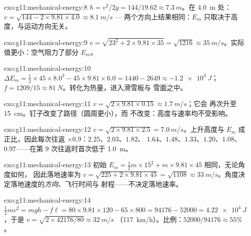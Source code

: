 \begin{solution}{exo:g11:mechanical-energy:8}
$h = v^2/2g = 144/19.62 \approx \qty{7.3}{m}$。在 \qty{4.0}{m} 处：
$v = \sqrt{144 - 2 \times 9.81 \times 4.0} \approx \qty{8.1}{m/s}$ ---
两个方向上结果相同：$E_m$ 只取决于高度，与运动方向无关。
\end{solution}

\begin{solution}{exo:g11:mechanical-energy:9}
$v = \sqrt{23^2 + 2 \times 9.81 \times 35} = \sqrt{1216} \approx
\qty{35}{m/s}$。实际值更小：空气阻力了部分
$E_m$。
\end{solution}

\begin{solution}{exo:g11:mechanical-energy:10}
$\Delta E_m = \tfrac12 \times 45 \times 8.0^2 - 45 \times 9.81 \times
6.0 = 1440 - 2649 \approx \qty{-1.2e3}{J}$；
$f = 1209/15 \approx \qty{81}{N}$。转化为热量，进入滑雪板与
雪面之中。
\end{solution}

\begin{solution}{exo:g11:mechanical-energy:11}
$v = \sqrt{2 \times 9.81 \times 0.15} \approx \qty{1.7}{m/s}$；它会
再次升至 \qty{15}{cm}。钉子改变了路径（圆周更小），而
不改变：高度与速率均不受影响。
\end{solution}

\begin{solution}{exo:g11:mechanical-energy:12}
$v = \sqrt{2 \times 9.81 \times 2.5} = \qty{7.0}{m/s}$。上升高度与
$E_m$ 成正比，因此每次往返 $\times 0.9$：$2.25$、$2.03$、$1.82$、
$1.64$、$1.48$、$1.33$、$1.20$、$1.08$、$0.97$——在第
$9$ 次往返时首次低于 \qty{1.0}{m}。
\end{solution}

\begin{solution}{exo:g11:mechanical-energy:13}
初始 $E_m = \tfrac12 m \times 15^2 + m \times 9.81 \times 45$ 相同，无论角度如何，
因此落地速率为
$v = \sqrt{225 + 2 \times 9.81 \times 45} = \sqrt{1108} \approx
\qty{33}{m/s}$。角度决定落地速度的\emph{方向}、飞行时间与
射程——不决定落地速率。
\end{solution}

\begin{solution}{exo:g11:mechanical-energy:14}
$\tfrac12 mv^2 = mgh - f\ell = 80 \times 9.81 \times 120 - 65 \times
800 = \num{94176} - \num{52000} = \qty{4.22e4}{J}$，于是
$v = \sqrt{2 \times \num{42176}/80} \approx \qty{32}{m/s}$
（\qty{117}{km/h}）。比例：$52000/94176 \approx 55\%$。
\end{solution}

